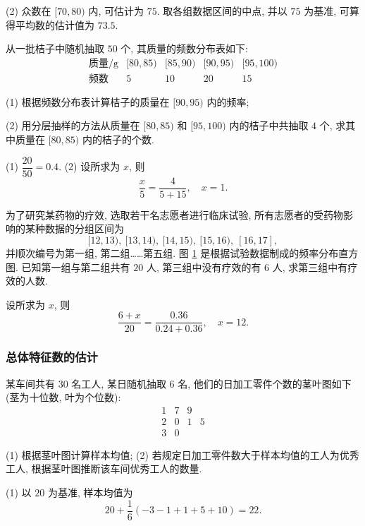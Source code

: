     (2) 众数在 $[70,80)$ 内, 可估计为 $75$. 取各组数据区间的中点, 并以 $75$ 为基准, 可算得平均数的估计值为 $73.5$.
\endsolution
    
\lianxi
\begin{exercise}
    从一批桔子中随机抽取 $50$ 个, 其质量的频数分布表如下:
    \[\begin{array}{c|cccc}
    \text{质量}/\text{g} & [80, 85) &[85, 90) 
        &[90, 95) &[95, 100) \\\hline
    \text{频数} &5 &10 &20 &15
    \end{array}\]
    
    (1) 根据频数分布表计算桔子的质量在 $[90, 95)$ 内的频率;
    
    (2) 用分层抽样的方法从质量在 $[80, 85)$ 和 $[95, 100)$ 内的桔子中共抽取 $4$ 个, 求其中质量在 $[80, 85)$ 内的桔子的个数.
\end{exercise}
\beginsolution
    (1) $\dfrac{20}{50}= 0.4$. (2) 设所求为 $x$, 则
    \[\frac{x}{5}= \frac{4}{5+15},\quad x=1.\]
\endsolution

\begin{exercise}
    为了研究某药物的疗效, 选取若干名志愿者进行临床试验, 所有志愿者的受药物影响的某种数据的分组区间为
    \[[12, 13),\ [13, 14),\ [14, 15),\ [15, 16),\ [16, 17],\] 
    并顺次编号为第一组, 第二组……第五组. 图 \ref{fig-190629-1700} 是根据试验数据制成的频率分布直方图.  已知第一组与第二组共有 $20$ 人, 第三组中没有疗效的有 $6$ 人, 求第三组中有疗效的人数. 
    \begin{figure}[htb]
        \small
        \centering
       \caption{}\label{fig-190629-1700}
    \end{figure}
\end{exercise}
\beginsolution
    设所求为 $x$, 则
    \[\frac{6+x}{20}= \frac{0.36}{0.24+0.36},\quad x= 12.\]
\endsolution
    
\subsubsection{总体特征数的估计}
\begin{example}
    某车间共有 $30$ 名工人, 某日随机抽取 $6$ 名, 他们的日加工零件个数的茎叶图如下 (茎为十位数, 叶为个位数):
    \[\begin{array}{c|ccc}
      1& 7 & 9 & \\
      2 & 0 & 1 & 5 \\
      3 & 0 &  &
    \end{array}\]
    
    (1) 根据茎叶图计算样本均值;\qquad
    (2) 若规定日加工零件数大于样本均值的工人为优秀工人, 根据茎叶图推断该车间优秀工人的数量.
\end{example}
\beginsolution
    (1) 以 $20$ 为基准, 样本均值为
    \[20+ \frac16(-3-1+1+5+10)= 22.\]

